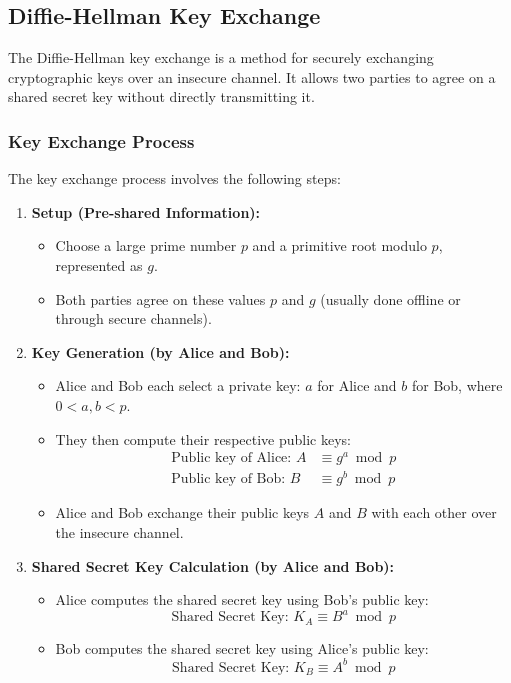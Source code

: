 \documentclass{article}
\begin{document}
\subsection{Diffie-Hellman Key Exchange}
The Diffie-Hellman key exchange is a method for securely exchanging cryptographic keys over an insecure channel. It allows two parties to agree on a shared secret key without directly transmitting it.

\subsubsection{Key Exchange Process}
The key exchange process involves the following steps:

\begin{enumerate}
    \item \textbf{Setup (Pre-shared Information):}
    \begin{itemize}
        \item Choose a large prime number $p$ and a primitive root modulo $p$, represented as $g$.
        \item Both parties agree on these values $p$ and $g$ (usually done offline or through secure channels).
    \end{itemize}

    \item \textbf{Key Generation (by Alice and Bob):}
    \begin{itemize}
        \item Alice and Bob each select a private key: $a$ for Alice and $b$ for Bob, where $0 < a, b < p$.
        \item They then compute their respective public keys:
            \begin{align*}
                \text{Public key of Alice: } A &\equiv g^a \bmod p \\
                \text{Public key of Bob: } B &\equiv g^b \bmod p
            \end{align*}
        \item Alice and Bob exchange their public keys $A$ and $B$ with each other over the insecure channel.
    \end{itemize}

    \item \textbf{Shared Secret Key Calculation (by Alice and Bob):}
    \begin{itemize}
        \item Alice computes the shared secret key using Bob's public key:
            \[ \text{Shared Secret Key: } K_A \equiv B^a \bmod p \]
        \item Bob computes the shared secret key using Alice's public key:
            \[ \text{Shared Secret Key: } K_B \equiv A^b \bmod p \]
    \end{itemize}
\end{enumerate}
\end{document}
